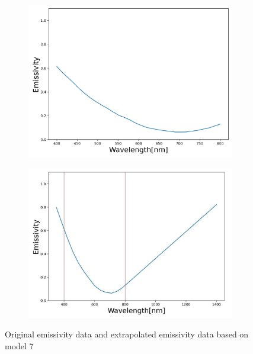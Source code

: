 \begin{figure}[htbp]
    \centering
    \begin{subfigure}{0.49\textwidth}
        \centering
        \includegraphics[width=\textwidth]{figures/emissivity_31_1.jpg}
        \caption{}
    \end{subfigure}
    \begin{subfigure}{0.49\textwidth}
        \centering
        \includegraphics[width=\textwidth]{figures/extrapolation_demo.jpg}
        \caption{}
    \end{subfigure}
    \caption{Original emissivity data and extrapolated emissivity data based on model 7 \cite{Taunay.2020b}}
    \label{fig: extrapolation_demo}
\end{figure}


